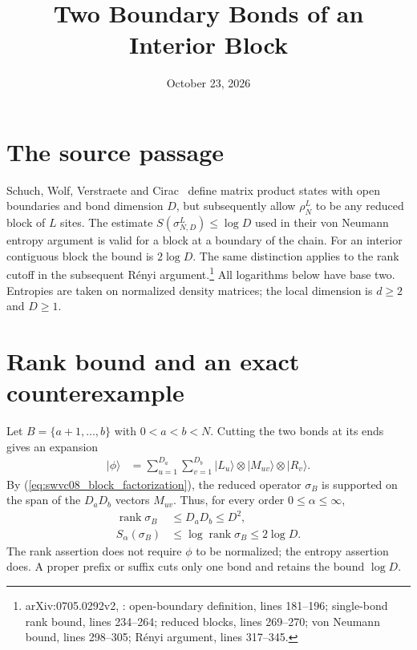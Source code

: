 \documentclass{article}
\title{Two Boundary Bonds of an Interior Block}
\author{}
\date{October 23, 2026}
\begin{document}
\maketitle
{}

\section{The source passage}

Schuch, Wolf, Verstraete and Cirac~\cite{Schuch2008EntropyScaling}
define matrix product states with open boundaries and bond dimension $D$,
but subsequently allow $\rho_N^L$ to be any reduced block of $L$ sites.
The estimate $S(\sigma_{N,D}^L)\le\log D$ used in their von Neumann entropy
argument is valid for a block at a boundary of the chain. For an interior
contiguous block the bound is $2\log D$. The same distinction applies to
the rank cutoff in the subsequent R\'enyi argument.\footnote{%
    arXiv:0705.0292v2, : open-boundary definition,
    lines 181--196; single-bond rank bound, lines 234--264; reduced blocks,
    lines 269--270; von Neumann bound, lines 298--305; R\'enyi argument,
    lines 317--345.}
All logarithms below have base two. Entropies are taken on normalized
density matrices; the local dimension is $d\ge2$ and $D\ge1$.

\section{Rank bound and an exact counterexample}

Let $B=\{a+1,\ldots,b\}$ with $0<a<b<N$. Cutting the two bonds at its
ends gives an expansion
\begin{align}
    |\phi\rangle & =\sum_{u=1}^{D_a}\sum_{v=1}^{D_b}
    |L_u\rangle\otimes|M_{uv}\rangle\otimes|R_v\rangle .
    \label{eq:swvc08_block_factorization}
\end{align}
By (\ref{eq:swvc08_block_factorization}), the reduced operator $\sigma_B$
is supported on the span of the $D_aD_b$ vectors $M_{uv}$. Thus, for every
order $0\le\alpha\le\infty$,
\begin{align}
    \operatorname{rank}\sigma_B & \le D_aD_b\le D^2,
    \label{eq:swvc08_block_rank}                                                \\
    S_\alpha(\sigma_B)          & \le\log\operatorname{rank}\sigma_B\le2\log D.
    \label{eq:swvc08_block_entropy}
\end{align}
The rank assertion does not require $\phi$ to be normalized; the entropy
assertion does. A proper prefix or suffix cuts only one bond and retains
the bound $\log D$.
\end{document}
